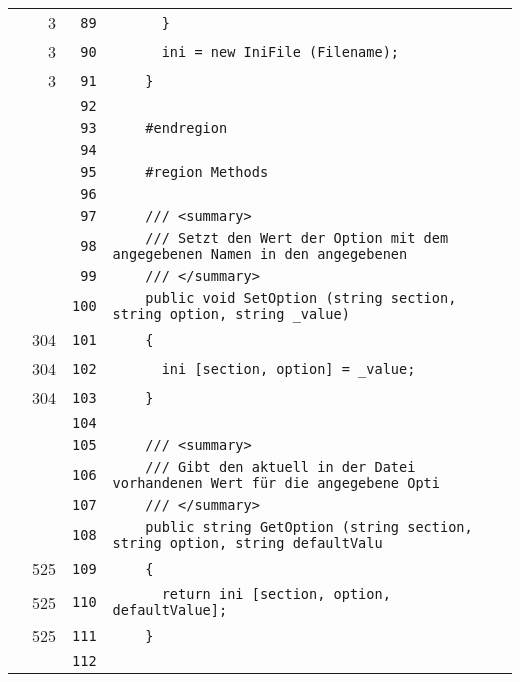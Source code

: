 \documentclass[a4paper,10pt]{article}
\begin{document}
\begin{longtable}[l]{lrrl}
\cellcolor{green} & 3 & \verb~89~ & \verb~      }~\\
\cellcolor{green} & 3 & \verb~90~ & \verb~      ini = new IniFile (Filename);~\\
\cellcolor{green} & 3 & \verb~91~ & \verb~    }~\\
\cellcolor{gray} &  & \verb~92~ & \verb~~\\
\cellcolor{gray} &  & \verb~93~ & \verb~    #endregion~\\
\cellcolor{gray} &  & \verb~94~ & \verb~~\\
\cellcolor{gray} &  & \verb~95~ & \verb~    #region Methods~\\
\cellcolor{gray} &  & \verb~96~ & \verb~~\\
\cellcolor{gray} &  & \verb~97~ & \verb~    /// <summary>~\\
\cellcolor{gray} &  & \verb~98~ & \verb~    /// Setzt den Wert der Option mit dem angegebenen Namen in den angegebenen~\\
\cellcolor{gray} &  & \verb~99~ & \verb~    /// </summary>~\\
\cellcolor{gray} &  & \verb~100~ & \verb~    public void SetOption (string section, string option, string _value)~\\
\cellcolor{green} & 304 & \verb~101~ & \verb~    {~\\
\cellcolor{green} & 304 & \verb~102~ & \verb~      ini [section, option] = _value;~\\
\cellcolor{green} & 304 & \verb~103~ & \verb~    }~\\
\cellcolor{gray} &  & \verb~104~ & \verb~~\\
\cellcolor{gray} &  & \verb~105~ & \verb~    /// <summary>~\\
\cellcolor{gray} &  & \verb~106~ & \verb~    /// Gibt den aktuell in der Datei vorhandenen Wert für die angegebene Opti~\\
\cellcolor{gray} &  & \verb~107~ & \verb~    /// </summary>~\\
\cellcolor{gray} &  & \verb~108~ & \verb~    public string GetOption (string section, string option, string defaultValu~\\
\cellcolor{green} & 525 & \verb~109~ & \verb~    {~\\
\cellcolor{green} & 525 & \verb~110~ & \verb~      return ini [section, option, defaultValue];~\\
\cellcolor{green} & 525 & \verb~111~ & \verb~    }~\\
\cellcolor{gray} &  & \verb~112~ & \verb~~\\

\end{longtable}
\end{document}
